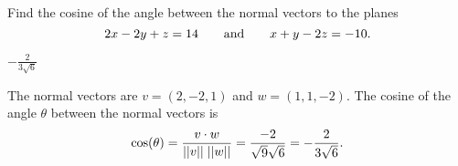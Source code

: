 \documentclass{ximera}
\author{Matthew Carr}
\begin{document}

\begin{exercise}\label{mc.exercise1}

 Find the cosine of the angle between the normal vectors to the planes 
\[
2x - 2y + z = 14 \qquad \text{and}\qquad x + y - 2z = -10\ldotp
\]
  
\begin{solution}

\ans  $-\frac{2}{3\sqrt{6}}$

\soln The normal vectors are $v = (2, -2, 1)$ and $w = ( 1, 1 , -2)$.  The cosine of the angle $\theta$ between the normal vectors is 
\[
\cos(\theta) = \frac{v\cdot w}{||v||\; ||w||} = \frac{-2}{\sqrt{9}\sqrt{6}} = -\frac{2}{3\sqrt{6}}\ldotp
\]

\end{solution}
\end{exercise}
\end{document}
